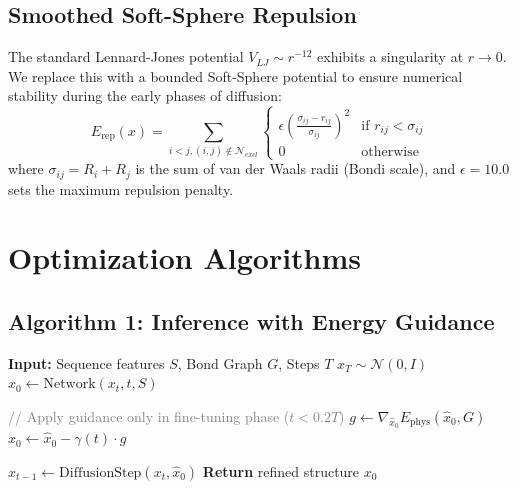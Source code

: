 \documentclass[twocolumn,10pt]{article}
\begin{document}
\begin{appendices}
\subsection{Smoothed Soft-Sphere Repulsion}
The standard Lennard-Jones potential $V_{LJ} \sim r^{-12}$ exhibits a singularity at $r \to 0$. We replace this with a bounded Soft-Sphere potential to ensure numerical stability during the early phases of diffusion:
\begin{equation}
    E_{\mathrm{rep}}(x) = \sum_{i < j, (i,j) \notin \mathcal{N}_{excl}} \begin{cases} 
        \epsilon \left( \frac{\sigma_{ij} - r_{ij}}{\sigma_{ij}} \right)^2 & \text{if } r_{ij} < \sigma_{ij} \\
        0 & \text{otherwise}
    \end{cases}
\end{equation}
where $\sigma_{ij} = R_i + R_j$ is the sum of van der Waals radii (Bondi scale), and $\epsilon=10.0$ sets the maximum repulsion penalty.

\section{Optimization Algorithms}\label{secA2}

\subsection{Algorithm 1: Inference with Energy Guidance}
\begin{algorithm}[H]
\caption{PhysDiff Inference (Strategy III)}
\label{alg:inference}
\begin{algorithmic}[1]
\State \textbf{Input:} Sequence features $S$, Bond Graph $G$, Steps $T$
\State $x_T \sim \mathcal{N}(0, I)$
    \State $\hat{x}_0 \gets \text{Network}(x_t, t, S)$
    
    \State \textcolor{gray}{// Apply guidance only in fine-tuning phase ($t < 0.2T$)}
        \State $g \gets \nabla_{\hat{x}_0} E_{\mathrm{phys}}(\hat{x}_0, G)$
        \State $\hat{x}_0 \gets \hat{x}_0 - \gamma(t) \cdot g$
    \EndIf
    
    \State $x_{t-1} \gets \text{DiffusionStep}(x_t, \hat{x}_0)$
\EndFor
\State \textbf{Return} refined structure $x_0$
\end{algorithmic}
\end{algorithm}


\end{appendices}
\end{document}
